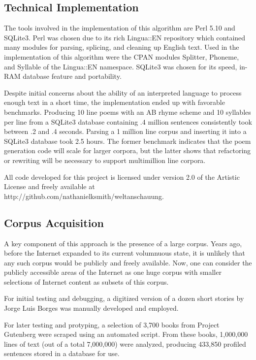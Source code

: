 \documentclass[10pt]{article}
\begin{document}
\subsection{Technical Implementation}
The tools involved in the implementation of this algorithm are Perl 5.10 and
SQLite3. Perl was chosen due to its rich Lingua::EN repository which contained
many modules for parsing, splicing, and cleaning up English text. Used in the
implementation of this algorithm were the CPAN modules Splitter, Phoneme, and
Syllable of the Lingua::EN namespace. SQLite3 was chosen for its speed, in-RAM
database feature and portability.

Despite initial concerns about the ability of an interpreted language to
process enough text in a short time, the implementation ended up with favorable
benchmarks. Producing 10 line poems with an AB rhyme scheme and 10 syllables
per line from a SQLite3 database containing .4 million sentences consistently
took between .2 and .4 seconds. Parsing a 1 million line corpus and inserting
it into a SQLite3 database took 2.5 hours.  The former benchmark indicates that
the poem generation code will scale for larger corpora, but the latter shows
that refactoring or rewriting will be necessary to support multimillion line
corpora.

All code developed for this project is licensed under version 2.0 of the
Artistic License and freely available at
http://github.com/nathanielksmith/weltanschauung.

\subsection{Corpus Acquisition}
A key component of this approach is the presence of a large corpus. Years ago,
before the Internet expanded to its current volumnuous state, it is unlikely
that any such corpus would be publicly and freely available. Now, one can
consider the publicly accessible areas of the Internet as one huge corpus with
smaller selections of Internet content as subsets of this corpus.

For initial testing and debugging, a digitized version of a dozen short stories
by Jorge Luis Borges was manually developed and employed.

For later testing and protyping, a selection of 3,700 books from Project
Gutenberg were scraped using an automated script. From these books, 1,000,000
lines of text (out of a total 7,000,000) were analyzed, producing 433,850
profiled sentences stored in a database for use.
\end{document}
